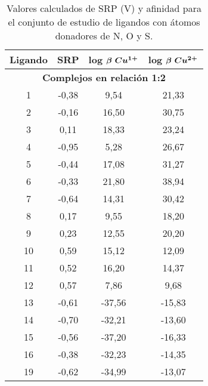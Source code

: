 \begin{table}[h]
\centering
\caption{Valores calculados de SRP (V) y afinidad para el conjunto de estudio de ligandos con átomos donadores de N, O y S.}
\begin{tabular}{cccc}
\hline
\textbf{Ligando} & \textbf{SRP} & \textbf{log $\boldsymbol{\beta$ $Cu^{1+}}$} & \textbf{log $\boldsymbol{\beta$ $Cu^{2+}}$} \\ \hline
\multicolumn{4}{c}{\textbf{Complejos en relación 1:2}}                         \\ \hline
1                & -0,38        & 9,54                 & 21,33                 \\
2                & -0,16        & 16,50                & 30,75                 \\
3                & 0,11         & 18,33                & 23,24                 \\
4                & -0,95        & 5,28                 & 26,67                 \\
5                & -0,44        & 17,08                & 31,27                 \\
6                & -0,33        & 21,80                & 38,94                 \\
7                & -0,64        & 14,31                & 30,42                 \\
8                & 0,17         & 9,55                 & 18,20                 \\
9                & 0,23         & 12,55                & 20,20                 \\
10               & 0,59         & 15,12                & 12,09                 \\
11               & 0,52         & 16,20                & 14,37                 \\
12               & 0,57         & 7,86                 & 9,68                  \\
13               & -0,61        & -37,56               & -15,83                \\
14               & -0,70        & -32,21               & -13,60                \\
15               & -0,56        & -37,20               & -16,33                \\
16               & -0,38        & -32,23               & -14,35                \\
19               & -0,62        & -34,99               & -13,07                \\

\end{tabular}
\end{table}
